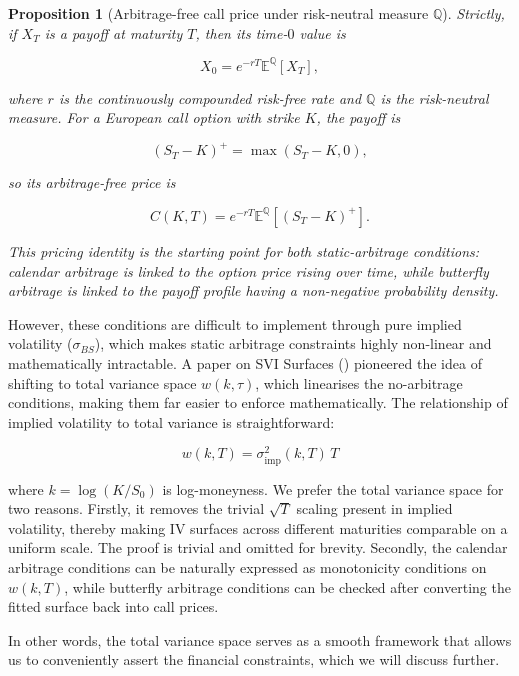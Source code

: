 \documentclass[12pt,oneside]{report}
\newtheorem{proposition}[theorem]{Proposition}
\theoremstyle{definition}
\theoremstyle{remark}
\begin{document}
\begin{proposition}[Arbitrage-free call price under risk-neutral measure $\mathbb{Q}$]

Strictly, if $X_T$ is a payoff at maturity $T$, then its time-$0$ value is

\[X_0 = e^{-rT}\mathbb{E}^{\mathbb{Q}}[X_T],\]

where $r$ is the continuously compounded risk-free rate and $\mathbb{Q}$ is the risk-neutral measure. For a European call option with strike $K$, the payoff is

\[(S_T - K)^+ = \max(S_T - K, 0),\]

so its arbitrage-free price is

\[C(K,T) = e^{-rT}\mathbb{E}^{\mathbb{Q}}[(S_T - K)^+].\]

This pricing identity is the starting point for both static-arbitrage conditions: calendar arbitrage is linked to the option price rising over time, while butterfly arbitrage is linked to the payoff profile having a non-negative probability density.
\end{proposition}

However, these conditions are difficult to implement through pure implied volatility (\(\sigma _{BS}\)), which makes static arbitrage constraints highly non-linear and mathematically intractable. A paper on SVI Surfaces (\citet{gatheral2014arbitrage}) pioneered the idea of shifting to total variance space \(w(k, \tau)\), which linearises the no-arbitrage conditions, making them far easier to enforce mathematically. The relationship of implied volatility to total variance is straightforward:

\[w(k,T) = \sigma_{\mathrm{imp}}^2(k,T)\,T\]

where $k = \log(K/S_0)$ is log-moneyness. We prefer the total variance space for two reasons. Firstly, it removes the trivial $\sqrt{T}$ scaling present in implied volatility, thereby making IV surfaces across different maturities comparable on a uniform scale. The proof is trivial and omitted for brevity. Secondly, the calendar arbitrage conditions can be naturally expressed as monotonicity conditions on $w(k,T)$, while butterfly arbitrage conditions can be checked after converting the fitted surface back into call prices.

In other words, the total variance space serves as a smooth framework that allows us to conveniently assert the financial constraints, which we will discuss further.

\end{document}
